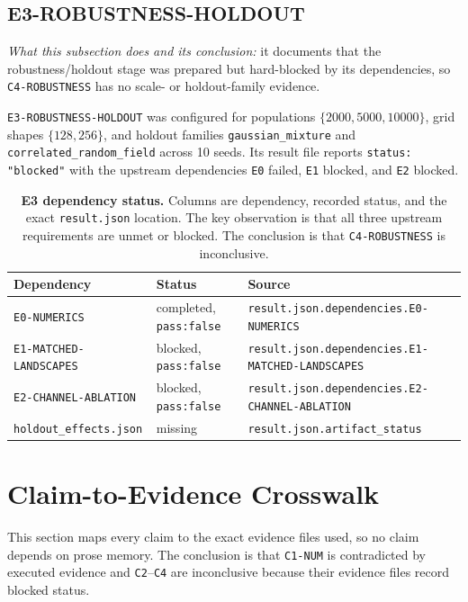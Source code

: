 \documentclass[11pt,a4paper]{article}
\newcommand{\code}[1]{\texttt{#1}}
\begin{document}
\subsection{E3-ROBUSTNESS-HOLDOUT}
\label{sec:e3}

\emph{What this subsection does and its conclusion:} it documents that the
robustness/holdout stage was prepared but hard-blocked by its dependencies, so
\code{C4-ROBUSTNESS} has no scale- or holdout-family evidence.

\code{E3-ROBUSTNESS-HOLDOUT} was configured for populations
$\{2000,5000,10000\}$, grid shapes $\{128,256\}$, and holdout families
\code{gaussian\_mixture} and \code{correlated\_random\_field} across 10 seeds.
Its result file reports \code{status: "blocked"} with the upstream dependencies
\code{E0} failed, \code{E1} blocked, and \code{E2} blocked.

\begin{table}[htbp]
\centering
\small
\begin{tabular}{@{}lll@{}}
\toprule
\textbf{Dependency} & \textbf{Status} & \textbf{Source} \\
\midrule
\code{E0-NUMERICS} & completed, \code{pass:false} & \code{result.json.dependencies.E0-NUMERICS} \\
\code{E1-MATCHED-LANDSCAPES} & blocked, \code{pass:false} & \code{result.json.dependencies.E1-MATCHED-LANDSCAPES} \\
\code{E2-CHANNEL-ABLATION} & blocked, \code{pass:false} & \code{result.json.dependencies.E2-CHANNEL-ABLATION} \\
\code{holdout\_effects.json} & missing & \code{result.json.artifact\_status} \\
\bottomrule
\end{tabular}
\caption{\textbf{E3 dependency status.} Columns are dependency, recorded status,
and the exact \code{result.json} location. The key observation is that all three
upstream requirements are unmet or blocked. The conclusion is that
\code{C4-ROBUSTNESS} is inconclusive.}
\label{tab:e3-block}
\end{table}

\section{Claim-to-Evidence Crosswalk}
\label{sec:crosswalk}

This section maps every claim to the exact evidence files used, so no claim
depends on prose memory. The conclusion is that \code{C1-NUM} is contradicted
by executed evidence and \code{C2}--\code{C4} are inconclusive because their
evidence files record blocked status.
\end{document}
